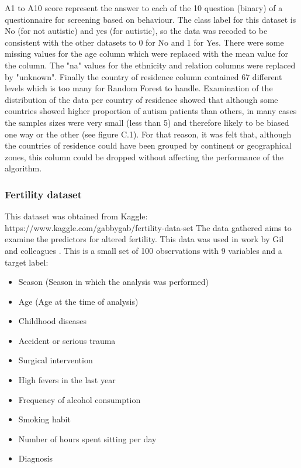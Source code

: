 A1 to A10 score represent the answer to each of the 10 question (binary) of a questionnaire for screening based on behaviour. 
The class label for this dataset is No (for not autistic) and yes (for autistic), so the data was recoded to be consistent with the other datasets to 0 for No and 1 for Yes.\newline
There were some missing values for the age column which were replaced with the mean value for the column. The "na" values for the ethnicity and relation columns were replaced by "unknown".\newline
Finally the country of residence column contained 67 different levels which is too many for Random Forest to handle. Examination of the distribution of the data per country of residence showed that although some countries showed higher proportion of autism patients than others, in many cases the samples sizes were very small (less than 5) and therefore likely to be biased one way or the other (see figure C.1). For that reason, it was felt that, although the countries of residence could have been grouped by continent or geographical zones, this column could be dropped without affecting the performance of the algorithm.\newline

\subsubsection{Fertility dataset}
This dataset was obtained from Kaggle:\newline
https://www.kaggle.com/gabbygab/fertility-data-set \newline
The data gathered aims to examine the predictors for altered fertility. This data was used in work by Gil and colleagues \citep{Gil:quR8OHIJ}.\newline
This is a small set of 100 observations with 9 variables and a target label:
\begin{itemize}
    \item Season (Season in which the analysis was performed)
    \item Age (Age at the time of analysis)
    \item Childhood diseases
    \item Accident or serious trauma
    \item Surgical intervention
    \item High fevers in the last year
    \item Frequency of alcohol consumption
    \item Smoking habit
    \item Number of hours spent sitting per day
    \item Diagnosis
\end{itemize}

